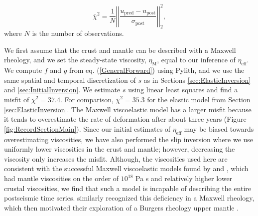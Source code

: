 \documentclass[draft,linenumbers]{AGUJournal}
\begin{document}
\begin{equation}\label{eq:Misfit}
  \bar\chi^2 = \frac{1}{N}\left|\left|\frac{u_\mathrm{pred} - u_\mathrm{post}}{\sigma_\mathrm{post}}\right|\right|_2^2,
\end{equation}
where $N$ is the number of observations.

We first assume that the crust and mantle can be described with a Maxwell rheology, and we set the steady-state viscosity, $\eta_\mathrm{M}$, equal to our inference of $\eta_{\mathrm{eff}}$.  We compute $f$ and $g$ from eq. (\ref{GeneralForward}) using Pylith, and we use the same spatial and temporal discretization of $s$ as in Sections \ref{sec:ElasticInversion} and \ref{sec:InitialInversion}. We estimate $s$ using linear least squares and find a misfit of $\bar\chi^2=37.4$. For comparison, $\bar\chi^2=35.3$ for the elastic model from Section \ref{sec:ElasticInversion}.  The Maxwell viscoelastic model has a larger misfit because it tends to overestimate the rate of deformation after about three years (Figure \ref{fig:RecordSectionMain}). Since our initial estimates of $\eta_\mathrm{eff}$ may be biased towards overestimating viscosities, we have also performed the slip inversion where we use uniformly lower viscosities in the crust and mantle; however, decreasing the viscosity only increases the misfit.  Although, the viscosities used here are consistent with the successful Maxwell viscoelastic models found by \citet{Rollins2015} and \citet{Spinler2015}, which had mantle viscosities on the order of $10^{18}$ Pa s and relatively higher lower crustal viscosities, we find that such a model is incapable of describing the entire postseismic time series.  \citet{Pollitz2001} similarly recognized this deficiency in a Maxwell rheology, which then motivated their exploration of a Burgers rheology upper mantle \citep{Pollitz2003}.  
\end{document}
